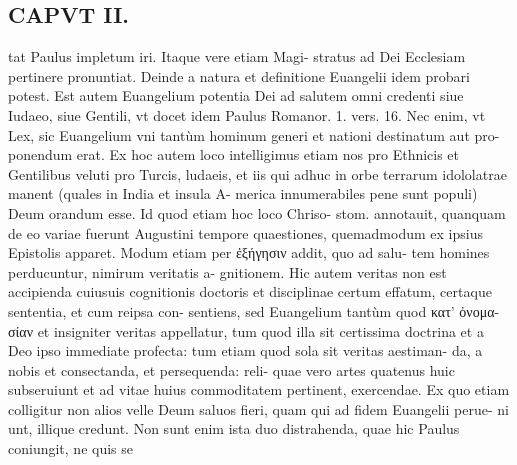 \documentclass{article}
\begin{document}
\begin{pages}
\section*{CAPVT II. }
\marginpar{[ p.53 ]}\pstart tat Paulus impletum iri. Itaque vere etiam Magi- stratus ad Dei Ecclesiam pertinere pronuntiat.  \pend\pstart Deinde a natura et definitione Euangelii idem probari potest. Est autem Euangelium potentia Dei ad salutem omni credenti siue Iudaeo, siue Gentili, vt docet idem Paulus Romanor. 1. vers. 16. Nec enim, vt Lex, sic Euangelium vni tantùm hominum generi et nationi destinatum aut pro- ponendum erat. Ex hoc autem loco intelligimus etiam nos pro Ethnicis et Gentilibus veluti pro Turcis, ludaeis, et iis qui adhuc in orbe terrarum idololatrae manent (quales in India et insula A- merica innumerabiles pene sunt populi) Deum orandum esse. Id quod etiam hoc loco Chriso- stom. annotauit, quanquam de eo variae fuerunt Augustini tempore quaestiones, quemadmodum ex ipsius Epistolis apparet.  \pend\pstart Modum etiam per ἐξήγησιν addit, quo ad salu- tem homines perducuntur, nimirum veritatis a- gnitionem. Hic autem veritas non est accipienda cuiusuis cognitionis doctoris et disciplinae certum effatum, certaque sententia, et cum reipsa con- sentiens, sed Euangelium tantùm quod κατ' ὀνομα- σίαν et insigniter veritas appellatur, tum quod illa sit certissima doctrina et a Deo ipso immediate profecta: tum etiam quod sola sit veritas aestiman- da, a nobis et consectanda, et persequenda: reli- quae vero artes quatenus huic subseruiunt et ad vitae huius commoditatem pertinent, exercendae. Ex quo etiam colligitur non alios velle Deum saluos fieri, quam qui ad fidem Euangelii perue- ni unt, illique credunt. Non sunt enim ista duo distrahenda, quae hic Paulus coniungit, ne quis se  \pend

\end{pages}
\end{document}
